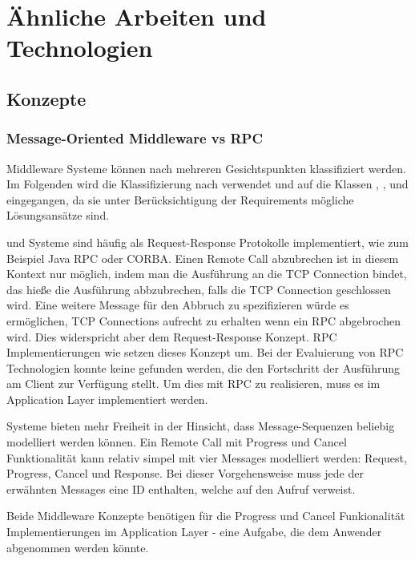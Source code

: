 
\chapter{Ähnliche Arbeiten und Technologien}
\label{K2}
\section{Konzepte}

\subsection{Message-Oriented Middleware vs RPC}
Middleware Systeme können nach mehreren Gesichtspunkten klassifiziert werden.
Im Folgenden wird die Klassifizierung nach \cite{bishop2003survey} verwendet und auf die Klassen , , und  eingegangen, da sie unter Berücksichtigung der Requirements mögliche Lösungsansätze sind.

 und  Systeme sind häufig als Request-Response  Protokolle implementiert, wie zum Beispiel Java RPC oder CORBA.
Einen Remote Call abzubrechen ist in diesem Kontext nur möglich, indem man die Ausführung an die TCP Connection bindet, das hieße die Ausführung abbzubrechen, falls die TCP Connection geschlossen wird.
Eine weitere Message für den Abbruch zu spezifizieren würde es ermöglichen, TCP Connections aufrecht zu erhalten wenn ein RPC abgebrochen wird.
Dies widerspricht aber dem Request-Response Konzept.
RPC Implementierungen wie \cite{qooxdoo} setzen dieses Konzept um.
Bei der Evaluierung von RPC Technologien konnte keine gefunden werden, die den Fortschritt der Ausführung am Client zur Verfügung stellt.
Um dies mit RPC zu realisieren, muss es im Application Layer implementiert werden.

 Systeme bieten mehr Freiheit in der Hinsicht, dass Message-Sequenzen beliebig modelliert werden können.
Ein Remote Call mit Progress und Cancel Funktionalität kann relativ simpel mit vier Messages  modelliert werden:
Request, Progress, Cancel und Response.
Bei dieser Vorgehensweise muss jede der erwähnten Messages eine ID enthalten, welche auf den Aufruf verweist.

Beide Middleware Konzepte benötigen für die Progress und Cancel Funkionalität Implementierungen im Application Layer - eine Aufgabe, die dem Anwender abgenommen werden könnte.





